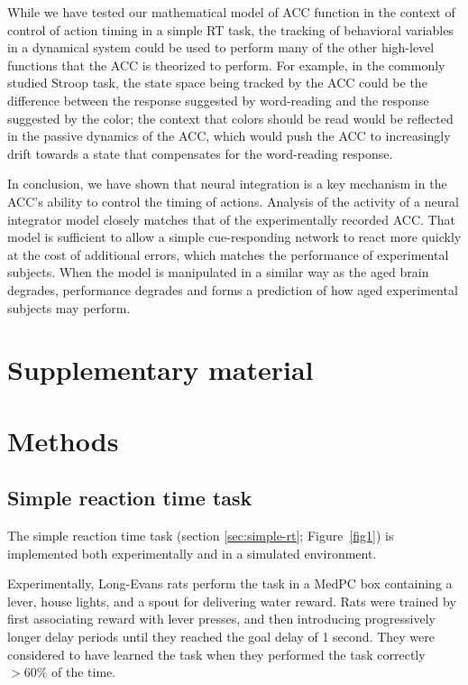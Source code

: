 \documentclass[11pt]{article}
\begin{document}
While we have tested our mathematical model
of ACC function in the context of
control of action timing in a simple RT task,
the tracking of behavioral variables
in a dynamical system could be used
to perform many of the other high-level functions
that the ACC is theorized to perform.
For example, in the commonly studied Stroop task,
the state space being tracked by
the ACC could be the difference between
the response suggested by word-reading and the
response suggested by the color;
the context that colors should be read
would be reflected in the passive dynamics
of the ACC, which would push the ACC
to increasingly drift towards a state
that compensates for the word-reading response.

In conclusion, we have shown that neural integration
is a key mechanism in the ACC's
ability to control the timing of actions.
Analysis of the activity of a neural integrator
model closely matches that of the experimentally recorded ACC.
That model is sufficient to allow
a simple cue-responding network
to react more quickly at the cost
of additional errors,
which matches the performance of experimental subjects.
When the model is manipulated
in a similar way as the aged brain degrades,
performance degrades and forms a prediction
of how aged experimental subjects may perform.




\clearpage

\appendix

\section*{Supplementary material}

\section{Methods}

\subsection{Simple reaction time task}

The simple reaction time task
(section \ref{sec:simple-rt}; Figure~\ref{fig1})
is implemented both experimentally
and in a simulated environment.

Experimentally, Long-Evans rats perform the task
in a MedPC box containing a lever,
house lights, and a spout for delivering water reward.
Rats were trained by first
associating reward with lever presses,
and then introducing progressively longer
delay periods until they reached the goal delay
of 1 second.
They were considered to have learned the task
when they performed the task correctly $>60\%$
of the time.
\end{document}
